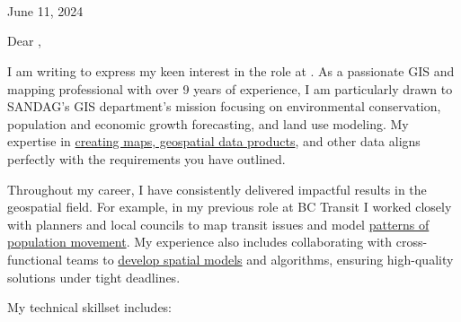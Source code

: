 \documentclass[letterpaper]{article}
\newcommand{\impt}[1]{\uline{#1}}
\begin{document}
\large
\JobManager \\
\JobManagerTitle \\
\textbf{\JobCompany} \\

\null\hfill June 11, 2024

Dear \JobManagerShort,

I am writing to express my keen interest in the
\impt{\JobTitle} role at {\JobCompany}.
As a passionate GIS and mapping professional with over 9 years of
experience, I am particularly drawn to SANDAG's GIS department's
mission focusing on 
environmental conservation, population and economic growth forecasting, and land use modeling.
My expertise in \impt{creating maps, geospatial data products}, and other data
aligns perfectly with the requirements you have outlined.

Throughout my career, I have consistently delivered
impactful results in the geospatial field.
For example, in my previous role at BC Transit I worked closely with
planners and local councils to map transit issues and model 
\impt{patterns of population movement}.
My experience also includes collaborating with cross-functional teams to
\impt{develop spatial models} and algorithms, ensuring high-quality solutions under tight deadlines.


\iffalse
- Collaborate with cross-functional teams,
- suitability analysis
· Organize and maintain geospatial datasets
- Design web-based and static GIS products to communicate GIS data effectively to other teams and stakeholders
· Collaborate with cross-functional teams
- Knowledge of spatial modeling techniques
- ability to manage customer relationships
- leadership and communication, and ability to meet deadlines
- Strong organization skills and ability to coordinate multiple tasks and deliverables
- build relationships, and effectively communicate
\fi

My technical skillset includes:
\end{document}
